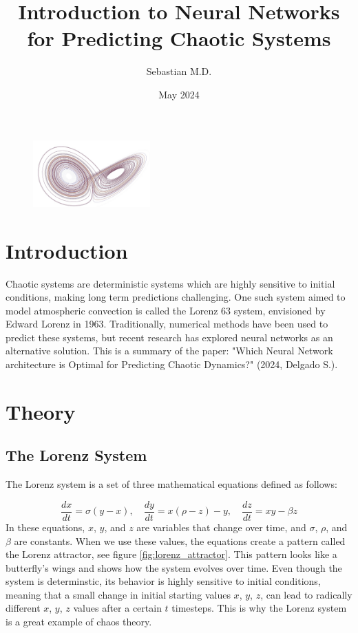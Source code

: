\documentclass[11pt]{article}
\title{Introduction to Neural Networks for Predicting Chaotic Systems}
\author{Sebastian M.D.}
\date{May 2024}
\begin{document}
\maketitle

\begin{figure}[h]
\centering
\includegraphics[width=0.4\textwidth]{title_page_image.jpeg}
\end{figure}

\section{Introduction}

Chaotic systems are deterministic systems which are highly sensitive to initial conditions, making long term predictions challenging. One such system aimed to model atmospheric convection is called the Lorenz 63 system, envisioned by Edward Lorenz in 1963. Traditionally, numerical methods have been used to predict these systems, but recent research has explored neural networks as an alternative solution. This is a summary of the paper: "Which Neural Network architecture is Optimal for Predicting Chaotic Dynamics?" (2024, Delgado S.).

\section{Theory}

\subsection{The Lorenz System}
The Lorenz system is a set of three mathematical equations defined as follows:

\[
\frac{dx}{dt} = \sigma(y - x), \quad \frac{dy}{dt} = x(\rho - z) - y, \quad \frac{dz}{dt} = xy - \beta z
\]
In these equations, $x$, $y$, and $z$ are variables that change over time, and $\sigma$, $\rho$, and $\beta$ are constants. When we use these values, the equations create a pattern called the Lorenz attractor, see figure \ref{fig:lorenz_attractor}. This pattern looks like a butterfly's wings and shows how the system evolves over time. Even though the system is determinstic, its behavior is highly sensitive to initial conditions, meaning that a small change in initial starting values $x$, $y$, $z$, can lead to radically different $x$, $y$, $z$ values after a certain $t$ timesteps. This is why the Lorenz system is a great example of chaos theory.
\end{document}
